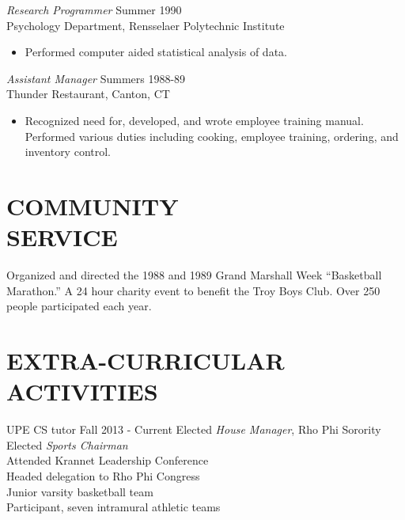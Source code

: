 \documentclass[line,margin]{res}
\begin{document}
\begin{resume}
                {\sl Research Programmer} \hfill            Summer 1990 \\
                Psychology Department, Rensselaer Polytechnic 
                Institute 
                 \begin{itemize}  \itemsep -2pt %
                 \item Performed computer aided statistical analysis 
                    of data. 
                 \end{itemize} 
                {\sl Assistant Manager} \hfill        Summers 1988-89 \\
                Thunder Restaurant, Canton, CT
                  \begin{itemize}
                   \item Recognized need for, developed, and wrote 
                    employee training manual. Performed various 
                    duties including cooking, employee training, 
                    ordering, and inventory control. 
                   \end{itemize} 
 
\section{COMMUNITY \\ SERVICE}  Organized and directed the 1988 and 1989 Grand 
                 Marshall Week \newline ``Basketball Marathon.'' A 24 hour 
                charity event to benefit the Troy Boys Club. Over 
                250 people participated each year. 

\section{EXTRA-CURRICULAR \\ ACTIVITIES}             
            	UPE CS tutor Fall 2013 - Current
		Elected {\it House Manager}, Rho Phi Sorority \\
            Elected {\it Sports Chairman} \\
            Attended Krannet Leadership Conference \\
                Headed delegation to Rho Phi Congress \\
                Junior varsity basketball team \\
                Participant, seven intramural athletic teams 
 

\end{resume}
\end{document}
